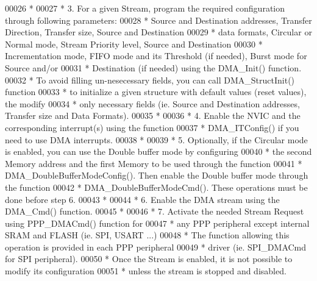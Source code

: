 \begin{DoxyCode}
00026 \textcolor{comment}{  *        }
00027 \textcolor{comment}{  *          3. For a given Stream, program the required configuration through following parameters:  
       }
00028 \textcolor{comment}{  *             Source and Destination addresses, Transfer Direction, Transfer size, Source and
       Destination }
00029 \textcolor{comment}{  *             data formats, Circular or Normal mode, Stream Priority level, Source and Destination }
00030 \textcolor{comment}{  *             Incrementation mode, FIFO mode and its Threshold (if needed), Burst mode for Source
       and/or }
00031 \textcolor{comment}{  *             Destination (if needed) using the DMA\_Init() function.}
00032 \textcolor{comment}{  *             To avoid filling un-nesecessary fields, you can call DMA\_StructInit() function}
00033 \textcolor{comment}{  *             to initialize a given structure with default values (reset values), the modify}
00034 \textcolor{comment}{  *             only necessary fields (ie. Source and Destination addresses, Transfer size and Data
       Formats).}
00035 \textcolor{comment}{  *}
00036 \textcolor{comment}{  *          4. Enable the NVIC and the corresponding interrupt(s) using the function }
00037 \textcolor{comment}{  *             DMA\_ITConfig() if you need to use DMA interrupts. }
00038 \textcolor{comment}{  *}
00039 \textcolor{comment}{  *          5. Optionally, if the Circular mode is enabled, you can use the Double buffer mode by
       configuring }
00040 \textcolor{comment}{  *             the second Memory address and the first Memory to be used through the function }
00041 \textcolor{comment}{  *             DMA\_DoubleBufferModeConfig(). Then enable the Double buffer mode through the function}
00042 \textcolor{comment}{  *             DMA\_DoubleBufferModeCmd(). These operations must be done before step 6.}
00043 \textcolor{comment}{  *    }
00044 \textcolor{comment}{  *          6. Enable the DMA stream using the DMA\_Cmd() function. }
00045 \textcolor{comment}{  *                }
00046 \textcolor{comment}{  *          7. Activate the needed Stream Request using PPP\_DMACmd() function for}
00047 \textcolor{comment}{  *             any PPP peripheral except internal SRAM and FLASH (ie. SPI, USART ...)}
00048 \textcolor{comment}{  *             The function allowing this operation is provided in each PPP peripheral}
00049 \textcolor{comment}{  *             driver (ie. SPI\_DMACmd for SPI peripheral).}
00050 \textcolor{comment}{  *             Once the Stream is enabled, it is not possible to modify its configuration}
00051 \textcolor{comment}{  *             unless the stream is stopped and disabled.}

\end{DoxyCode}

